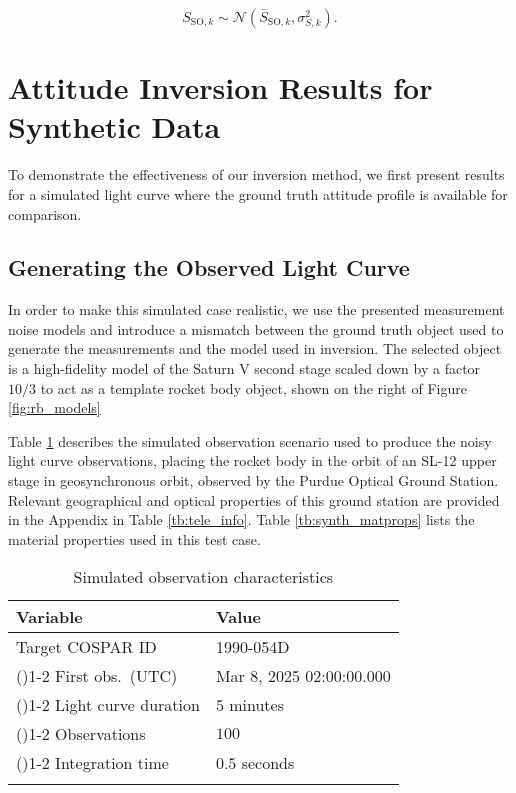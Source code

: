 \documentclass[a4paper,twocolumn]{spaceDebrisC} %
\newcommand{\grule}[0]{\arrayrulecolor{darkgray}\cmidrule(){1-2}}
\newcommand{\brule}[0]{\arrayrulecolor{black} \bottomrule}
\newcommand{\figsmall}[0]{0.3\textwidth}
\begin{document}
\begin{equation} \label{eq:lc_dist}
 S_{\text{SO},k} \sim \mathcal{N}\left( \bar{S}_{\text{SO},k}, \sigma^2_{S,k} \right).
 \end{equation}

\section{Attitude Inversion Results for Synthetic Data} \label{sec:synth_results}

To demonstrate the effectiveness of our inversion method, we first present results for a simulated light curve where the ground truth attitude profile is available for comparison.

\subsection{Generating the Observed Light Curve}

In order to make this simulated case realistic, we use the presented measurement noise models and introduce a mismatch between the ground truth object used to generate the measurements and the model used in inversion. The selected object is a high-fidelity model of the Saturn V second stage scaled down by a factor $10/3$ to act as a template rocket body object, shown on the right of Figure \ref{fig:rb_models}


Table \ref{tb:case1_in} describes the simulated observation scenario used to produce the noisy light curve observations, placing the rocket body in the orbit of an SL-12 upper stage in geosynchronous orbit, observed by the Purdue Optical Ground Station. Relevant geographical and optical properties of this ground station are provided in the Appendix in Table \ref{tb:tele_info}. Table \ref{tb:synth_matprops} lists the material properties used in this test case.

\begin{table}[H]
  \centering
  \renewcommand{\arraystretch}{1.3} %
  \caption{Simulated observation characteristics}
  \vspace*{6pt}
  \begin{tabular}{@{} l l @{}}
    \toprule
    Variable & Value \\ \midrule
    Target COSPAR ID & 1990-054D \\ \grule
    First obs.\ (UTC) & Mar 8, 2025 02:00:00.000 \\ \grule
    Light curve duration & $5$ minutes \\ \grule
    Observations & $100$ \\ \grule
    Integration time & $0.5$ seconds \\ \brule
  \end{tabular}
  \label{tb:case1_in}
\end{table}
\end{document}

